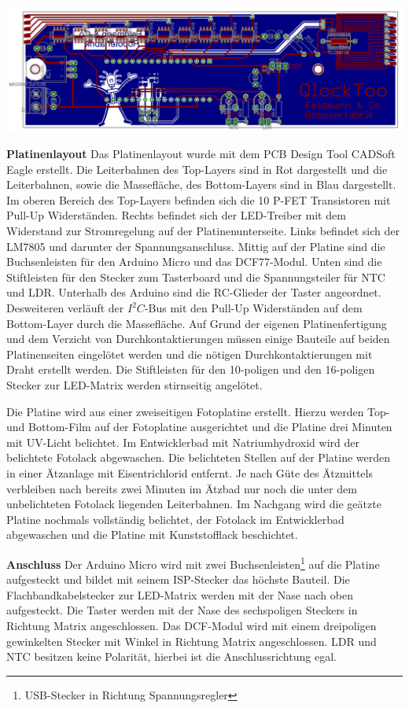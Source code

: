 {
\centering 
\includegraphics[width=\textwidth]{Abbildungen/Elektronik/Layout01} 
}
\begin{multicols}{2}

\textbf{Platinenlayout} Das Platinenlayout wurde mit dem PCB Design Tool CADSoft Eagle erstellt. Die Leiterbahnen des Top-Layers sind in Rot dargestellt und die Leiterbahnen, sowie die Massefläche, des Bottom-Layers sind in Blau dargestellt. Im oberen Bereich des Top-Layers befinden sich die 10 P-FET Transistoren mit  Pull-Up Widerständen. Rechts befindet sich der LED-Treiber mit dem Widerstand zur Stromregelung auf der Platinenunterseite. Links befindet sich der LM7805 und darunter der Spannungsanschluss. Mittig auf der Platine sind die Buchsenleisten für den Arduino Micro und das DCF77-Modul. Unten sind die Stiftleisten für den Stecker zum Tasterboard und die Spannungsteiler für NTC und LDR. Unterhalb des Arduino sind die RC-Glieder der Taster angeordnet. Desweiteren verläuft der $I^{2}C$-Bus mit den Pull-Up Widerständen auf dem Bottom-Layer durch die Massefläche. Auf Grund der eigenen Platinenfertigung und dem Verzicht von Durchkontaktierungen müssen einige Bauteile auf beiden Platinenseiten eingelötet werden und die nötigen Durchkontaktierungen mit Draht erstellt werden. Die Stiftleisten für den 10-poligen und den 16-poligen Stecker zur LED-Matrix werden stirnseitig angelötet. 


Die Platine wird aus einer zweiseitigen Fotoplatine erstellt. Hierzu werden Top- und Bottom-Film auf der Fotoplatine ausgerichtet und die Platine drei Minuten mit UV-Licht belichtet. Im Entwicklerbad mit Natriumhydroxid wird der belichtete Fotolack abgewaschen. Die belichteten Stellen auf der Platine werden in einer Ätzanlage mit Eisentrichlorid entfernt. Je nach Güte des Ätzmittels verbleiben nach bereits zwei Minuten im Ätzbad nur noch die unter dem unbelichteten Fotolack liegenden Leiterbahnen. Im Nachgang wird die geätzte Platine nochmals vollständig belichtet, der Fotolack im Entwicklerbad abgewaschen und die Platine mit Kunststofflack beschichtet.

\textbf{Anschluss} Der Arduino Micro wird mit zwei Buchsenleisten\footnote{USB-Stecker in Richtung Spannungsregler} auf die Platine aufgesteckt und bildet mit seinem ISP-Stecker das höchste Bauteil. Die Flachbandkabelstecker zur LED-Matrix werden mit der Nase nach oben aufgesteckt. Die Taster werden mit der Nase des sechspoligen Steckers in Richtung Matrix angeschlossen. Das DCF-Modul wird mit einem dreipoligen gewinkelten Stecker mit Winkel in Richtung Matrix angeschlossen. LDR und NTC besitzen keine Polarität, hierbei ist die Anschlussrichtung egal.
\end{multicols}

